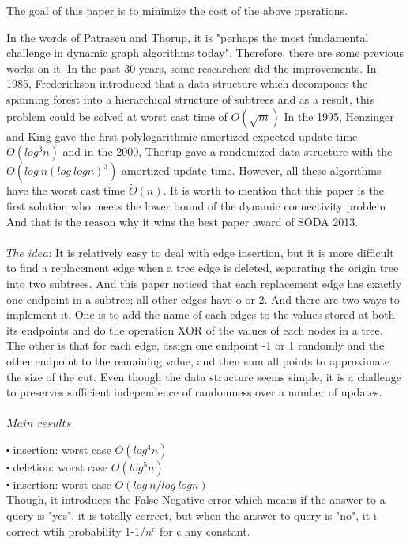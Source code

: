 \documentclass[conference,compsoc]{IEEEtran}
\begin{document}
The goal of this paper is to minimize the cost of  the above operations. 

In the words of Patrascu and Thorup, it is "perhaps the most fundamental challenge in dynamic graph algorithms today".  Therefore, there are some previous works on it. In the past 30 years, some researchers did the improvements. In 1985, Frederickson introduced that a data structure which decomposes the spanning forest into a hierarchical structure of subtrees and as a result, this problem could be solved at worst cast time of $O(\sqrt m)$ 
In the 1995, Henzinger and King gave the first polylogarithmic amortized expected update time $O(log^3 n)$ and in the 2000, Thorup gave a randomized data structure with the $O(log\ n(log \ log n)^3)$ amortized update time. However, all these algorithms have the worst cast time $\tilde{O} (n)$.
It is worth to mention that this paper is the first solution who meets the lower bound of the dynamic connectivity problem And that is the reason why it wins the best paper award of SODA 2013.
\\
\\
$The$ $idea$: 
It is relatively easy to deal with edge insertion, but it is more difficult to find a replacement edge when a tree edge is deleted, separating the origin tree into two subtrees. And this paper noticed that each replacement edge has exactly one endpoint in a subtree; all other edges have o or 2. And there are two ways to implement it. One is to add the name of each edges to the values stored at both its endpoints and do the operation XOR of the values of each nodes in a tree. The other is that for each edge, assign one endpoint -1 or 1 randomly and the other endpoint to the remaining value, and then sum all points to approximate the size of the cut. Even though the data structure seems simple, it is a challenge to preserves sufficient independence of randomness over a number of updates.
\\
\\
$Main$ $results$


$\centerdot$  insertion: worst case $O(log^4n)$\\

$\centerdot$  deletion: worst case $O(log^5n)$\\

$\centerdot$  insertion: worst case $O(log\ n/log\ log n)$\\

Though, it introduces the False Negative error which means if the answer to a query is "yes", it is totally correct, but when the answer to query is "no", it i correct wtih probability 1-1/$n^c$ for c any constant.
\\
\end{document}
